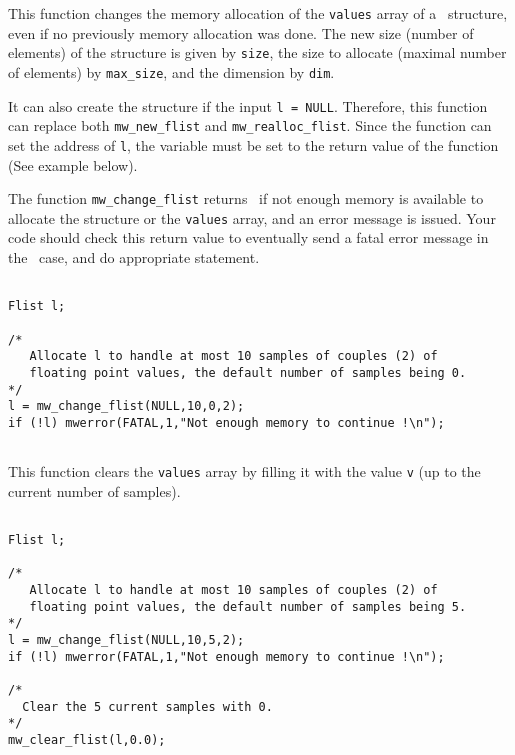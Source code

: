 \Description
This function changes the memory allocation of the \verb+values+ array
of a \flist\ structure, even if no previously memory allocation was done.
The new size (number of elements) of the structure is given by \verb+size+,
the size to allocate (maximal number of elements) by \verb+max_size+,
and the dimension by \verb+dim+.

It can also create the structure if the input \verb+l = NULL+.
Therefore, this function can replace both \verb+mw_new_flist+ and
\verb+mw_realloc_flist+. 
Since the function can set the address of \verb+l+, the variable must be set 
to the return value of the function (See example below).

The function \verb+mw_change_flist+ returns \Null\ if not enough memory is 
available to allocate the structure or the  \verb+values+ array, and an error 
message is issued. 
Your code should check this return value to eventually send a fatal error 
message in the \Null\ case, and do appropriate statement.

\Next
\Example
\begin{verbatim}

Flist l;

/* 
   Allocate l to handle at most 10 samples of couples (2) of 
   floating point values, the default number of samples being 0. 
*/
l = mw_change_flist(NULL,10,0,2);
if (!l) mwerror(FATAL,1,"Not enough memory to continue !\n");


\end{verbatim}

\newpage %


\Description
This function clears the \verb+values+ array by filling it
with the value \verb+v+ (up to the current number of samples).

\Next
\Example
\begin{verbatim}

Flist l;

/* 
   Allocate l to handle at most 10 samples of couples (2) of 
   floating point values, the default number of samples being 5. 
*/
l = mw_change_flist(NULL,10,5,2);
if (!l) mwerror(FATAL,1,"Not enough memory to continue !\n");

/* 
  Clear the 5 current samples with 0.
*/
mw_clear_flist(l,0.0);


\end{verbatim}

